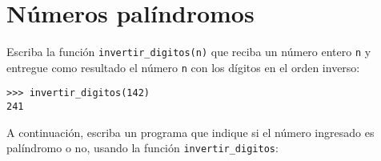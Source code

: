 \section{Números palíndromos}

Escriba la función \lstinline!invertir_digitos(n)! que reciba un número
entero \lstinline!n! y entregue como resultado el número \lstinline!n!
con los dígitos en el orden inverso:

\begin{lstlisting}
>>> invertir_digitos(142)
241
\end{lstlisting}

A continuación, escriba un programa que indique si el número ingresado
es palíndromo o no, usando la función \lstinline!invertir_digitos!:
